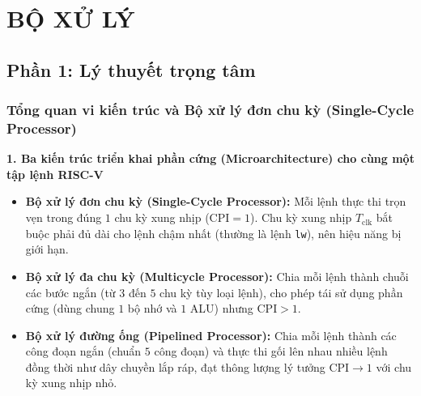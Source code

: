 \chapter{BỘ XỬ LÝ}

\section{Phần 1: Lý thuyết trọng tâm}

\subsection{Tổng quan vi kiến trúc và Bộ xử lý đơn chu kỳ (Single-Cycle Processor)}

\textbf{1. Ba kiến trúc triển khai phần cứng (Microarchitecture) cho cùng một tập lệnh RISC-V}
\begin{itemize}
    \item \textbf{Bộ xử lý đơn chu kỳ (Single-Cycle Processor):} Mỗi lệnh thực thi trọn vẹn trong đúng $1$ chu kỳ xung nhịp ($\text{CPI} = 1$). Chu kỳ xung nhịp $T_{\text{clk}}$ bắt buộc phải đủ dài cho lệnh chậm nhất (thường là lệnh \texttt{lw}), nên hiệu năng bị giới hạn.
    \item \textbf{Bộ xử lý đa chu kỳ (Multicycle Processor):} Chia mỗi lệnh thành chuỗi các bước ngắn (từ $3$ đến $5$ chu kỳ tùy loại lệnh), cho phép tái sử dụng phần cứng (dùng chung $1$ bộ nhớ và $1$ ALU) nhưng $\text{CPI} > 1$.
    \item \textbf{Bộ xử lý đường ống (Pipelined Processor):} Chia mỗi lệnh thành các công đoạn ngắn (chuẩn $5$ công đoạn) và thực thi gối lên nhau nhiều lệnh đồng thời như dây chuyền lắp ráp, đạt thông lượng lý tưởng $\text{CPI} \to 1$ với chu kỳ xung nhịp nhỏ.
\end{itemize}

